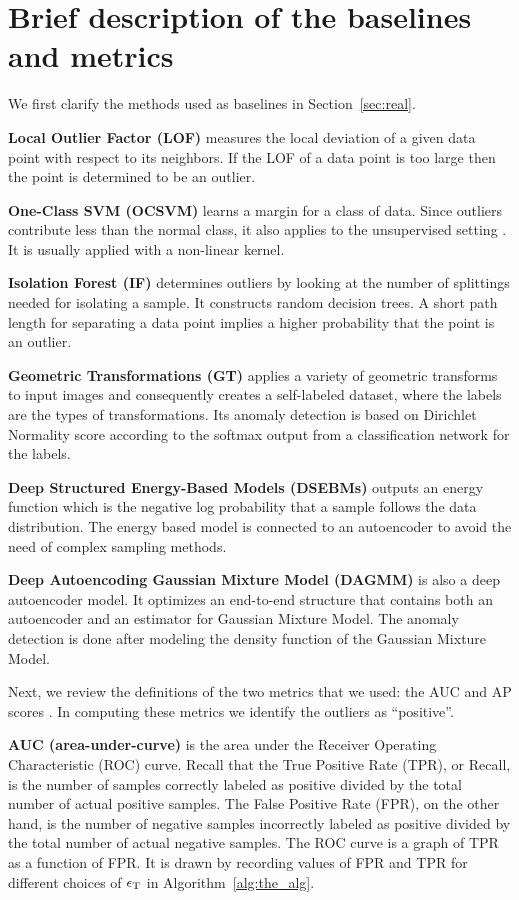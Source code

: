 \documentclass{article} \usepackage{iclr2020_conference,times}
\def\Secref#1{Section~\ref{#1}}
\def\rvepsilon{{\mathbf{\epsilon}}}
\begin{document}
\section{Brief description of the baselines and metrics}
\label{sec:describe_baselines}
We first clarify the methods used as baselines in \Secref{sec:real}. 

\textbf{Local Outlier Factor (LOF)} measures the local deviation of a given data point with respect to its neighbors. If the LOF of a data point is too large then the point is determined to be an outlier. 

\textbf{One-Class SVM (OCSVM)} learns a margin for a class of data. Since outliers contribute less than the normal class, it also applies to the unsupervised setting \citep{goldstein2016comparative}. It is usually applied with a non-linear kernel.

\textbf{Isolation Forest (IF)} determines outliers by looking at the number of splittings needed for isolating a sample. It constructs random decision trees. A short path length for separating a data point implies a higher probability that the point is an outlier.

\textbf{Geometric Transformations (GT)} applies a variety of geometric transforms to input images and consequently creates a self-labeled dataset, where the labels are the types of transformations. Its anomaly detection is based on Dirichlet Normality score according to the softmax output from a classification network for the labels. 

\textbf{Deep Structured Energy-Based Models (DSEBMs)} outputs
an energy function which is the negative log probability that a sample follows the data distribution. The energy based model is connected to an autoencoder to avoid the need of complex sampling methods.

\textbf{Deep Autoencoding Gaussian Mixture Model (DAGMM)} is also a deep autoencoder model. It optimizes an end-to-end structure that contains both an autoencoder and an estimator for Gaussian Mixture Model. The anomaly detection is done after modeling the density function of the Gaussian Mixture Model.

Next, we review the definitions of the two metrics that we used: the AUC and AP scores  \citep{davis2006relationship}. In computing these metrics we identify the outliers as ``positive''.



\textbf{AUC (area-under-curve)} is the area under the Receiver Operating Characteristic (ROC) curve. Recall that the True Positive Rate (TPR), or Recall, is the number of samples correctly labeled as positive divided by the total number of actual positive samples. The False Positive Rate (FPR), on the other hand, is the number of negative samples incorrectly labeled as positive divided by the total number of actual negative samples. The ROC curve is a graph of TPR as a function of FPR. It is drawn by recording values of FPR and TPR for different choices of $\rvepsilon_{\rm{T}}$ in Algorithm~\ref{alg:the_alg}.
\end{document}
